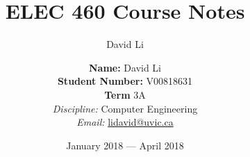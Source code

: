 \documentclass{scrreprt}
\title{ELEC 460 Course Notes}
\author{David Li}
\date{January 2018 --- April 2018}
\theoremstyle{plain}
\theoremstyle{definition}
\theoremstyle{remark}
\begin{document}
\makeatletter
\def\printauthor{%
	{\large \@author}}              
\makeatother
\author{%
	\textbf{Name: }  David Li \\
	\textbf{Student Number:} V00818631	\\
	\textbf{Term}  3A  \\
	\textit{Discipline:} Computer Engineering \\  \vspace{4pt}
	\textit{Email:} \href{mailto:lidavid@uvic.ca}{lidavid@uvic.ca}
}

\maketitle
	
\end{document}
